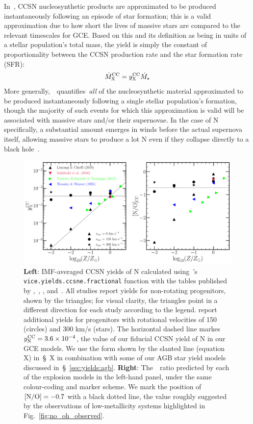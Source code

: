 \documentclass[ms.tex]{subfiles}
\begin{document}
In~\vice, CCSN nucleosynthetic products are approximated to be produced
instantaneously following an episode of star formation; this is a valid
approximation due to how short the lives of massive stars are compared to the
relevant timescales for GCE.
Based on this and its definition as being in units of a stellar population's
total mass, the yield is simply the constant of proportionality between the
CCSN production rate and the star formation rate (SFR):
\begin{equation}
\dot{M}_\text{X}^\text{CC} = y_\text{X}^\text{CC}\dot{M}_\star
\end{equation}
More generally,~~quantifies~\textit{all} of the nucleosynthetic material
approximated to be produced instantaneously following a single stellar
population's formation, though the majority of such events for which this
approximation is valid will be associated with massive stars and/or their
supernovae.
In the case of N specifically, a substantial amount emerges in winds before the
actual supernova itself, allowing massive stars to produce a lot N even if they
collapse directly to a black hole~\citep{Griffith2021}.

\begin{figure}
\centering
\includegraphics[scale = 0.45]{n_cc_yields.pdf}
\caption{
\textbf{Left}: IMF-averaged CCSN yields of N calculated using~\vice's
\texttt{vice.yields.ccsne.fractional} function with the tables published by
\citet[][blue]{Woosley1995},~\citet[][green]{Nomoto2013},
\citet[][red]{Sukhbold2016}, and~\citet[][black]{Limongi2018}.
All studies report yields for non-rotating progenitors, shown by the triangles;
for visual clarity, the triangles point in a different direction for each study
according to the legend.
\citet{Limongi2018} report additional yields for progenitors with rotational
velocities of 150 (circles) and 300 km/s (stars).
The horizontal dashed line markes~$y_\text{N}^\text{CC} = 3.6\times10^{-4}$,
the value of our fiducial CCSN yield of N in our GCE models.
We use the form shown by the slanted line (equation X) in~\S~X in combination
with some of our AGB star yield models discussed in~\S~\ref{sec:yields:agb}.
\textbf{Right}: The~\no~ratio predicted by each of the explosion models in
the left-hand panel, under the same colour-coding and marker scheme.
We mark the position of~$\text{[N/O]} = -0.7$ with a black dotted line, the value
roughly suggested by the observations of low-metallicity systems highlighted
in Fig.~\ref{fig:no_oh_observed}.
}
\label{fig:n_cc_yields}
\end{figure}
\end{document}
